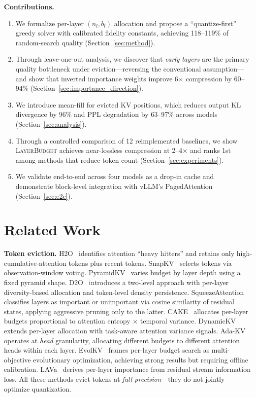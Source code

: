 \documentclass{article}
\newcommand{\layerbudget}{\textsc{LayerBudget}\xspace}
\begin{document}
\textbf{Contributions.}
\begin{enumerate}
    \item We formalize per-layer $(n_l, b_l)$ allocation and propose a ``quantize-first'' greedy solver with calibrated fidelity constants, achieving 118--119\% of random-search quality (Section~\ref{sec:method}).
    \item Through leave-one-out analysis, we discover that \emph{early layers} are the primary quality bottleneck under eviction---reversing the conventional assumption---and show that inverted importance weights improve 6$\times$ compression by 60--94\% (Section~\ref{sec:importance_direction}).
    \item We introduce mean-fill for evicted KV positions, which reduces output KL divergence by 96\% and PPL degradation by 63--97\% across models (Section~\ref{sec:analysis}).
    \item Through a controlled comparison of 12 reimplemented baselines, we show \layerbudget achieves near-lossless compression at 2--4$\times$ and ranks 1st among methods that reduce token count (Section~\ref{sec:experiments}).
    \item We validate end-to-end across four models as a drop-in cache and demonstrate block-level integration with vLLM's PagedAttention (Section~\ref{sec:e2e}).
\end{enumerate}

\section{Related Work}
\label{sec:related}

\textbf{Token eviction.}
H2O~\citep{zhang2024h2o} identifies attention ``heavy hitters'' and retains only high-cumulative-attention tokens plus recent tokens.
SnapKV~\citep{snapkv2024} selects tokens via observation-window voting.
PyramidKV~\citep{pyramidkv2024} varies budget by layer depth using a fixed pyramid shape.
D2O~\citep{d2o2025} introduces a two-level approach with per-layer diversity-based allocation and token-level density persistence.
SqueezeAttention~\citep{squeezeattention2025} classifies layers as important or unimportant via cosine similarity of residual states, applying aggressive pruning only to the latter.
CAKE~\citep{cake2025} allocates per-layer budgets proportional to attention entropy $\times$ temporal variance.
DynamicKV~\citep{dynamickv2024} extends per-layer allocation with task-aware attention variance signals.
Ada-KV~\citep{adakv2025} operates at \emph{head} granularity, allocating different budgets to different attention heads within each layer.
EvolKV~\citep{evolkv2025} frames per-layer budget search as multi-objective evolutionary optimization, achieving strong results but requiring offline calibration.
LAVa~\citep{lava2025} derives per-layer importance from residual stream information loss.
All these methods evict tokens at \emph{full precision}---they do not jointly optimize quantization.
\end{document}
